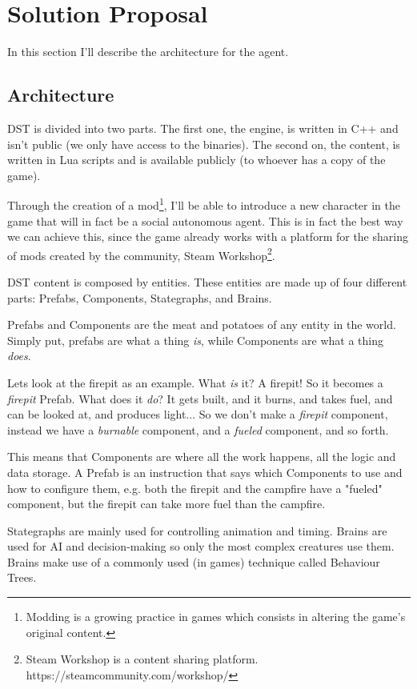 \section{Solution Proposal}
In this section I'll describe the architecture for the agent.

\subsection{Architecture}
\ac{DST} is divided into two parts.
The first one, the engine, is written in C++ and isn't public (we only have access to the binaries).
The second on, the content, is written in Lua scripts and is available publicly (to whoever has a copy of the game).

Through the creation of a mod\footnote{Modding is a growing practice in games which consists in altering the game's original content.}, I'll be able to introduce a new character in the game that will in fact be a social autonomous agent.
This is in fact the best way we can achieve this, since the game already works with a platform for the sharing of mods created by the community, Steam Workshop\footnote{Steam Workshop is a content sharing platform. https://steamcommunity.com/workshop/}.

\ac{DST} content is composed by entities.
These entities are made up of four different parts: Prefabs, Components, Stategraphs, and Brains.

Prefabs and Components are the meat and potatoes of any entity in the world.
Simply put, prefabs are what a thing \textit{is}, while Components are what a thing \textit{does}.


Lets look at the firepit as an example.
What \textit{is} it?
A firepit!
So it becomes a \textit{firepit} Prefab.
What does it \textit{do}?
It gets built, and it burns, and takes fuel, and can be looked at, and produces light...
So we don't make a \textit{firepit} component, instead we have a \textit{burnable} component, and a \textit{fueled} component, and so forth.

This means that Components are where all the work happens, all the logic and data storage.
A Prefab is an instruction that says which Components to use and how to configure them, e.g. both the firepit and the campfire have a "fueled" component, but the firepit can take more fuel than the campfire.

Stategraphs are mainly used for controlling animation and timing.
Brains are used for AI and decision-making so only the most complex creatures use them.
Brains make use of a commonly used (in games) technique called Behaviour Trees.

